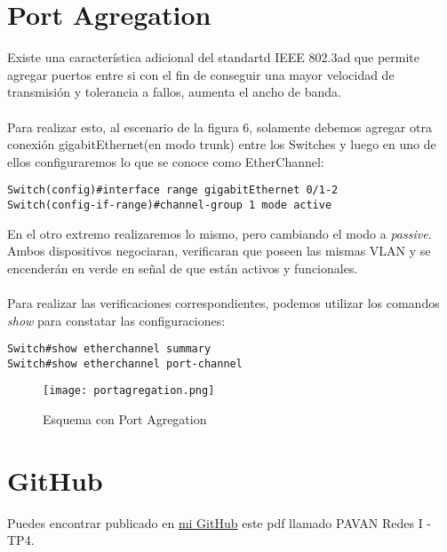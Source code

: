 \documentclass{article}
\begin{document}
\section{Port Agregation}
Existe una característica adicional del standartd IEEE 802.3ad que permite agregar puertos entre si con el fin de conseguir una mayor velocidad de transmisión y tolerancia a fallos, aumenta el ancho de banda.
\\\\
Para realizar esto, al escenario de la figura 6, solamente debemos agregar otra conexión gigabitEthernet(en modo trunk) entre los Switches y luego en uno de ellos configuraremos lo que se conoce como EtherChannel:
\begin{lstlisting}
Switch(config)#interface range gigabitEthernet 0/1-2
Switch(config-if-range)#channel-group 1 mode active
\end{lstlisting}
En el otro extremo realizaremos lo mismo, pero cambiando el modo a \textit{passive}. Ambos dispositivos negociaran, verificaran que poseen las mismas VLAN y se encenderán en verde en señal de que están activos y funcionales.
\\\\
Para realizar las verificaciones correspondientes, podemos utilizar los comandos \textit{show} para constatar las configuraciones:
\begin{lstlisting}
Switch#show etherchannel summary
Switch#show etherchannel port-channel
\end{lstlisting}
\begin{figure}[H]
    \centering
    \texttt{[image: portagregation.png]}
    \caption{Esquema con Port Agregation}
    \label{fig:enter-label}
\end{figure}
\section{GitHub}
Puedes encontrar publicado en \href{https://github.com/martinpavan1/redes1}{mi GitHub} este pdf llamado PAVAN Redes I - TP4.
\end{document}
